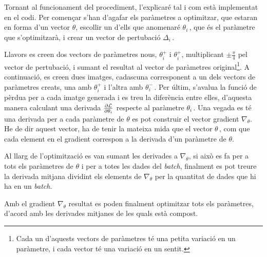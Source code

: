 Tornant al funcionament del procediment, l'explicaré tal i com està implementat en el codi. Per començar s'han d'agafar els paràmetres a optimitzar, que estaran en forma d'un vector $\theta$, escollir un d'ells que anomenaré $\theta_{i}\,$, que és el paràmetre que s'optimitzarà, i crear un vector de pertubació $\Delta_{i}\,$. 

Llavors es creen dos vectors de paràmetres nous, $\theta^{+}_{i}$ i $\theta^{+}_{i}$, multiplicant $\pm\frac{\pi}{4}$ pel vector de pertubació, i sumant el resultat al vector de paràmetres original\footnote{Cada un d'aquests vectors de paràmetres té una petita variació en un paràmetre, i cada vector té una variació en un sentit.}. A continuació, es creen dues imatges, cadascuna corresponent a un dels vectors de paràmetres creats, una amb $\theta^{+}_{i}$ i l'altra amb $\theta^{-}_{i}\,$. Per últim, s'avalua la funció de pèrdua per a cada imatge generada i es treu la diferència entre elles, d'aquesta manera calculant una derivada $\pdv{\mathcal{L}}{\theta_i}$ respecte al paràmetre $\theta_{i}\,$.
Una vegada es té una derivada per a cada paràmetre de $\theta$ es pot construir el vector gradient $\nabla_\theta$. He de dir aquest vector, ha de tenir la mateixa mida que el vector $\theta\,$, com que cada element en el gradient correspon a la derivada d'un paràmetre de $\theta$.

Al llarg de l'optimització es van sumant les derivades a $\nabla_\theta$, si això es fa per a tots els paràmetres de $\theta$ i per a totes les dades del \textit{batch}, finalment es pot treure la derivada mitjana dividint els elements de $\nabla_{\theta}$ per la quantitat de dades que hi ha en un \textit{batch}.

Amb el gradient $\nabla_{\theta}$ resultat es poden finalment optimitzar tots els paràmetres, d'acord amb les derivades mitjanes de les quals està compost. 
 

